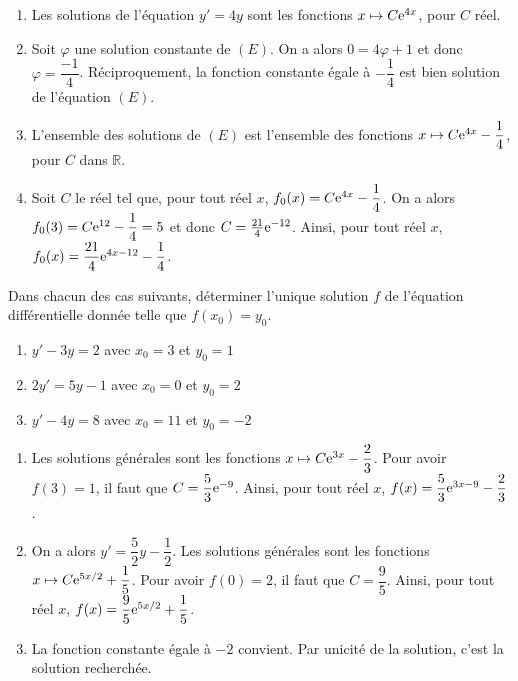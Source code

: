 \documentclass[11pt,fleqn, openany]{book} %
\begin{document}
\begin{solution}\hspace{0pt}
\begin{enumerate}\item Les solutions de l'équation \(y'=4y\) sont les fonctions \(x\mapsto C\mathrm{e}^{4x}\), pour \(C\) réel.
	\item Soit \(\varphi\) une solution constante de \((E)\). On a alors \(0 = 4 \varphi + 1\) et donc \(\varphi= \dfrac{-1}{4}\). Réciproquement, la fonction constante égale à \(-\dfrac{1}{4}\) est bien solution de l'équation \((E)\).
	\item L'ensemble des solutions de \((E)\) est l'ensemble des fonctions \(x\mapsto C\mathrm{e}^{4x}-\dfrac{1}{4}\), pour \(C\) dans \(\mathbb{R}\).
	\item Soit \(C\) le réel tel que, pour tout réel \(x\), \(f_0(x)=C\mathrm{e}^{4x}-\dfrac{1}{4}\). On a alors \(f_0(3)=C\mathrm{e}^{12}-\dfrac{1}{4}=5\) et donc \(C=\frac{21}{4}\mathrm{e}^{-12}\). Ainsi, pour tout réel \(x\), \(f_0(x)=\dfrac{21}{4}\mathrm{e}^{4x-12}-\dfrac{1}{4}\).\end{enumerate}
\end{solution}



\begin{exercise}Dans chacun des cas suivants, déterminer l'unique solution $f$ de l'équation différentielle donnée telle que $f(x_0)=y_0$.

\begin{enumerate}
\item $y'-3y=2$ avec $x_0=3$ et $y_0=1$
\item $2y'=5y-1$ avec $x_0=0$ et $y_0=2$
\item $y'-4y=8$ avec $x_0=11$ et $y_0=-2$
\end{enumerate}\end{exercise}

\begin{solution}\hspace{0pt}
\begin{enumerate}\item Les solutions générales sont les fonctions \(x\mapsto C\mathrm{e}^{3x}-\dfrac{2}{3}\). Pour avoir \(f(3)=1\), il faut que \(C=\dfrac{5}{3}\mathrm{e}^{-9}\). Ainsi, pour tout réel \(x\), \(f(x)=\dfrac{5}{3}\mathrm{e}^{3x-9}-\dfrac{2}{3}\).
\vskip5pt
\item On a alors \(y'=\dfrac{5}{2}y-\dfrac{1}{2}\).  Les solutions générales sont les fonctions \(x\mapsto C\mathrm{e}^{5x/2}+\dfrac{1}{5}\). Pour avoir \(f(0)=2\), il faut que \(C=\dfrac{9}{5}\). Ainsi, pour tout réel \(x\), \(f(x)=\dfrac{9}{5}\mathrm{e}^{5x/2}+\dfrac{1}{5}\).
\vskip5pt
\item La fonction constante égale à \(-2\) convient. Par unicité de la solution, c'est la solution recherchée.\end{enumerate}

 \end{solution}
 
\end{document}
